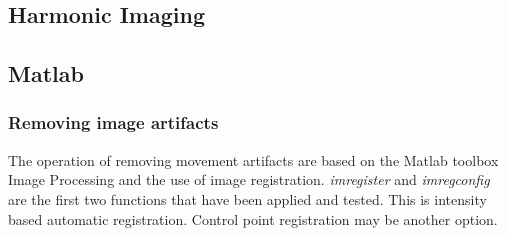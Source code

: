 \subsection{Harmonic Imaging}

\subsection{Matlab}
\subsubsection{Removing image artifacts}
The operation of removing movement artifacts are based on the Matlab toolbox Image Processing and the use of image registration. \textit{imregister} and \textit{imregconfig} are the first two functions that have been applied and tested. This is intensity based automatic registration. Control point registration may be another option.









